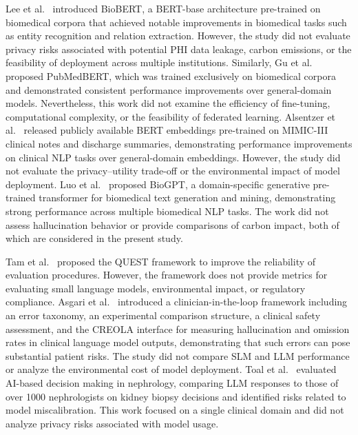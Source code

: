 Lee et al.~\cite{lee2020biobert} introduced BioBERT, a BERT-base architecture pre-trained on biomedical corpora that achieved notable improvements in biomedical tasks such as entity recognition and relation extraction. However, the study did not evaluate privacy risks associated with potential PHI data leakage, carbon emissions, or the feasibility of deployment across multiple institutions. Similarly, Gu et al.~\cite{gu2020pubmedbert} proposed PubMedBERT, which was trained exclusively on biomedical corpora and demonstrated consistent performance improvements over general-domain models. Nevertheless, this work did not examine the efficiency of fine-tuning, computational complexity, or the feasibility of federated learning. Alsentzer et al.~\cite{alsentzer2019clinicalbert} released publicly available BERT embeddings pre-trained on MIMIC-III clinical notes and discharge summaries, demonstrating performance improvements on clinical NLP tasks over general-domain embeddings. However, the study did not evaluate the privacy--utility trade-off or the environmental impact of model deployment. Luo et al.~\cite{luo2023biogpt} proposed BioGPT, a domain-specific generative pre-trained transformer for biomedical text generation and mining, demonstrating strong performance across multiple biomedical NLP tasks. The work did not assess hallucination behavior or provide comparisons of carbon impact, both of which are considered in the present study.

Tam et al.~\cite{tam2024quest} proposed the QUEST framework to improve the reliability of evaluation procedures. However, the framework does not provide metrics for evaluating small language models, environmental impact, or regulatory compliance. Asgari et al.~\cite{asgari2022hallucination} introduced a clinician-in-the-loop framework including an error taxonomy, an experimental comparison structure, a clinical safety assessment, and the CREOLA interface for measuring hallucination and omission rates in clinical language model outputs, demonstrating that such errors can pose substantial patient risks. The study did not compare SLM and LLM performance or analyze the environmental cost of model deployment. Toal et al.~\cite{toal2025llm} evaluated AI-based decision making in nephrology, comparing LLM responses to those of over 1000 nephrologists on kidney biopsy decisions and identified risks related to model miscalibration. This work focused on a single clinical domain and did not analyze privacy risks associated with model usage.

